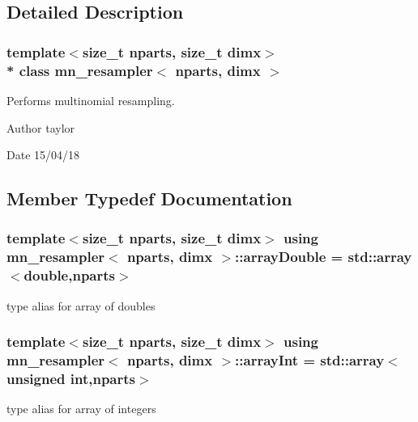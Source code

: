 \subsection{Detailed Description}
\subsubsection*{template$<$size\+\_\+t nparts, size\+\_\+t dimx$>$\\*
class mn\+\_\+resampler$<$ nparts, dimx $>$}

Performs multinomial resampling. 

\begin{DoxyAuthor}{Author}
taylor 
\end{DoxyAuthor}
\begin{DoxyDate}{Date}
15/04/18 
\end{DoxyDate}


\subsection{Member Typedef Documentation}
\subsubsection[{\texorpdfstring{array\+Double}{arrayDouble}}]{\setlength{\rightskip}{0pt plus 5cm}template$<$size\+\_\+t nparts, size\+\_\+t dimx$>$ using {\bf mn\+\_\+resampler}$<$ nparts, dimx $>$\+::{\bf array\+Double} =  std\+::array$<$double,nparts$>$}\hypertarget{classmn__resampler_a42c1ad632e0bcc40df749e370aa4c301}{}\label{classmn__resampler_a42c1ad632e0bcc40df749e370aa4c301}
type alias for array of doubles 
\subsubsection[{\texorpdfstring{array\+Int}{arrayInt}}]{\setlength{\rightskip}{0pt plus 5cm}template$<$size\+\_\+t nparts, size\+\_\+t dimx$>$ using {\bf mn\+\_\+resampler}$<$ nparts, dimx $>$\+::{\bf array\+Int} =  std\+::array$<$unsigned int,nparts$>$}\hypertarget{classmn__resampler_a37074929b181708729008b6fd798626f}{}\label{classmn__resampler_a37074929b181708729008b6fd798626f}
type alias for array of integers 
